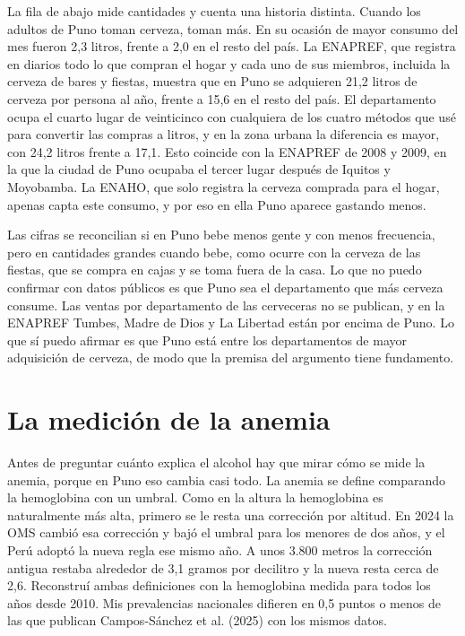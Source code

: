 \documentclass[11pt]{article}
\begin{document}
La fila de abajo mide cantidades y cuenta una historia distinta. Cuando los adultos de Puno toman cerveza, toman más. En su ocasión de mayor consumo del mes fueron 2,3 litros, frente a 2,0 en el resto del país. La ENAPREF, que registra en diarios todo lo que compran el hogar y cada uno de sus miembros, incluida la cerveza de bares y fiestas, muestra que en Puno se adquieren 21,2 litros de cerveza por persona al año, frente a 15,6 en el resto del país. El departamento ocupa el cuarto lugar de veinticinco con cualquiera de los cuatro métodos que usé para convertir las compras a litros, y en la zona urbana la diferencia es mayor, con 24,2 litros frente a 17,1. Esto coincide con la ENAPREF de 2008 y 2009, en la que la ciudad de Puno ocupaba el tercer lugar después de Iquitos y Moyobamba. La ENAHO, que solo registra la cerveza comprada para el hogar, apenas capta este consumo, y por eso en ella Puno aparece gastando menos.

Las cifras se reconcilian si en Puno bebe menos gente y con menos frecuencia, pero en cantidades grandes cuando bebe, como ocurre con la cerveza de las fiestas, que se compra en cajas y se toma fuera de la casa. Lo que no puedo confirmar con datos públicos es que Puno sea el departamento que más cerveza consume. Las ventas por departamento de las cerveceras no se publican, y en la ENAPREF Tumbes, Madre de Dios y La Libertad están por encima de Puno. Lo que sí puedo afirmar es que Puno está entre los departamentos de mayor adquisición de cerveza, de modo que la premisa del argumento tiene fundamento.

\section{La medición de la anemia}

Antes de preguntar cuánto explica el alcohol hay que mirar cómo se mide la anemia, porque en Puno eso cambia casi todo. La anemia se define comparando la hemoglobina con un umbral. Como en la altura la hemoglobina es naturalmente más alta, primero se le resta una corrección por altitud. En 2024 la OMS cambió esa corrección y bajó el umbral para los menores de dos años, y el Perú adoptó la nueva regla ese mismo año. A unos 3.800 metros la corrección antigua restaba alrededor de 3,1 gramos por decilitro y la nueva resta cerca de 2,6. Reconstruí ambas definiciones con la hemoglobina medida para todos los años desde 2010. Mis prevalencias nacionales difieren en 0,5 puntos o menos de las que publican Campos-Sánchez et al. (2025) con los mismos datos.
\end{document}
